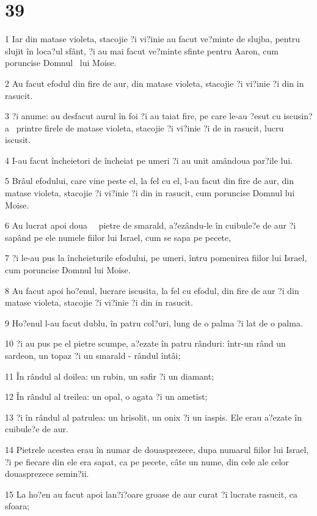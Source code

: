 \chapter{39}

\par 1 Iar din matase violeta, stacojie ?i vi?inie au facut ve?minte de slujba, pentru slujit în loca?ul sfânt, ?i au mai facut ve?minte sfinte pentru Aaron, cum poruncise Domnul  lui Moise.
\par 2 Au facut efodul din fire de aur, din matase violeta, stacojie ?i vi?inie ?i din in rasucit.
\par 3 ?i anume: au desfacut aurul în foi ?i au taiat fire, pe care le-au ?esut cu iscusin?a  printre firele de matase violeta, stacojie ?i vi?inie ?i de in rasucit, lucru  iscusit.
\par 4 I-au facut încheietori de încheiat pe umeri ?i au unit amândoua par?ile lui.
\par 5 Brâul efodului, care vine peste el, la fel cu el, l-au facut din fire de aur, din matase violeta, stacojie ?i vi?inie ?i din in rasucit, cum poruncise Domnul lui Moise.
\par 6 Au lucrat apoi doua   pietre de smarald, a?ezându-le în cuibule?e de aur ?i sapând pe ele numele fiilor lui Israel, cum se sapa pe pecete,
\par 7 ?i le-au pus la încheieturile efodului, pe umeri, întru pomenirea fiilor lui Israel, cum poruncise Domnul lui Moise.
\par 8 Au facut apoi ho?enul, lucrare iscusita, la fel cu efodul, din fire de aur ?i din matase violeta, stacojie ?i vi?inie ?i din in rasucit.
\par 9 Ho?enul l-au facut dublu, în patru col?uri, lung de o palma ?i lat de o palma.
\par 10 ?i au pus pe el pietre scumpe, a?ezate în patru rânduri: într-un rând un sardeon, un topaz ?i un smarald - rândul întâi;
\par 11 În rândul al doilea: un rubin, un safir ?i un diamant;
\par 12 În rândul al treilea: un opal, o agata ?i un ametist;
\par 13 ?i în rândul al patrulea: un hrisolit, un onix ?i un iaspis. Ele erau a?ezate în cuibule?e de aur.
\par 14 Pietrele acestea erau în numar de douasprezece, dupa numarul fiilor lui Israel, ?i pe fiecare din ele era sapat, ca pe pecete, câte un nume, din cele ale celor douasprezece semin?ii.
\par 15 La ho?en au facut apoi lan?i?oare groase de aur curat ?i lucrate rasucit, ca sfoara;
